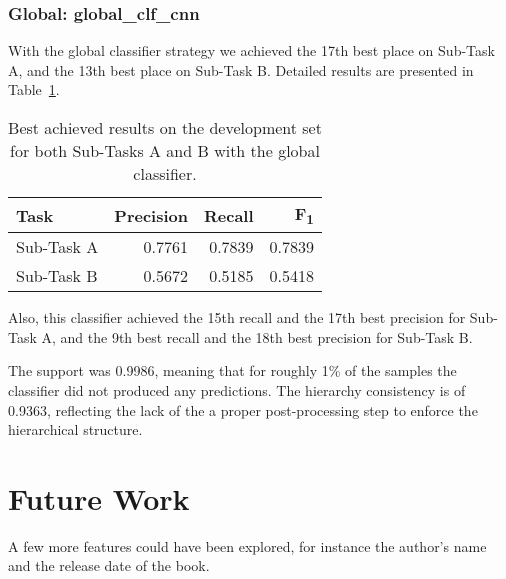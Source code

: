 \documentclass[11pt,a4paper]{article}
\begin{document}
\subsubsection{Global: global\_clf\_cnn}

With the global classifier strategy we achieved the 17th best place on Sub-Task A,
and the 13th best place on Sub-Task B. Detailed results are presented in
Table~\ref{global_devset-results}.

\begin{table}[!h]
\begin{center}
\begin{tabular}{|l|r|r|r|}
\hline\centering\textbf{Task}  & \textbf{Precision} &  \textbf{Recall} &  \textbf{F\textsubscript{1}}\\
\hline
 Sub-Task A   &  0.7761 & 0.7839 & 0.7839 \\
 Sub-Task B   &  0.5672 & 0.5185 & 0.5418 \\
\hline
\end{tabular}
\end{center}
\caption{\label{global_devset-results} Best achieved results on the development
          set for both Sub-Tasks A and B with the global classifier.}
\end{table}

Also, this classifier achieved the 15th recall and the 17th best precision
for Sub-Task A, and the 9th best recall and the 18th best precision for Sub-Task B.

The support was 0.9986, meaning that for roughly 1\% of the samples the classifier
did not produced any predictions. The hierarchy consistency is of 0.9363, reflecting
the lack of the a proper post-processing step to enforce the hierarchical structure.








\section{Future Work}\label{future}

A few more features could have been explored, for instance the author's name
and the release date of the book.
\end{document}
